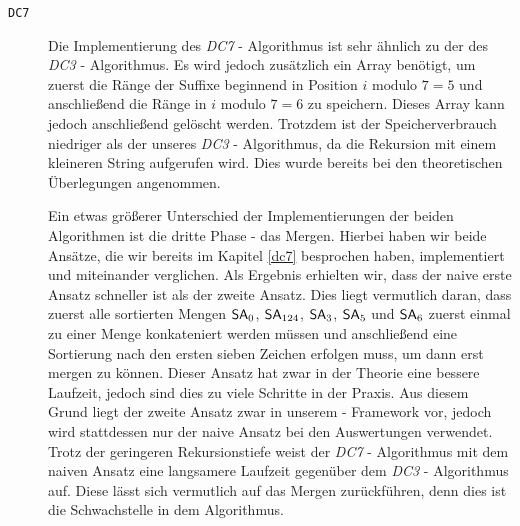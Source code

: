 \begin{description}
	\item[\texttt{DC7}]

	Die Implementierung des \emph{DC7} - Algorithmus ist sehr ähnlich zu der des \emph{DC3} - Algorithmus. Es wird jedoch zusätzlich ein Array benötigt, um zuerst die Ränge der Suffixe beginnend in Position $i \text{ modulo } 7 = 5$ und anschließend die Ränge in $i \text{ modulo } 7 = 6$ zu speichern. Dieses Array kann jedoch anschließend gelöscht werden.
	Trotzdem ist der Speicherverbrauch niedriger als der unseres \emph{DC3} - Algorithmus, da die Rekursion mit einem kleineren String aufgerufen wird. Dies wurde bereits bei den theoretischen Überlegungen angenommen.

	Ein etwas größerer Unterschied der Implementierungen der beiden Algorithmen ist die dritte Phase - das Mergen. Hierbei haben wir beide Ansätze, die wir bereits im Kapitel \ref{dc7} besprochen haben, implementiert und miteinander verglichen. Als Ergebnis erhielten wir, dass der naive erste Ansatz schneller ist als der zweite Ansatz. Dies liegt vermutlich daran, dass zuerst alle sortierten Mengen $\sa_0$, $\sa_{124}$, $\sa_3$, $\sa_5$ und  $\sa_6$ zuerst einmal zu einer Menge konkateniert werden müssen und anschließend eine Sortierung nach den ersten sieben Zeichen erfolgen muss, um dann erst mergen zu können. Dieser Ansatz hat zwar in der Theorie eine bessere Laufzeit, jedoch sind dies zu viele Schritte in der Praxis. Aus diesem Grund liegt der zweite Ansatz zwar in unserem \sacabench - Framework vor, jedoch wird stattdessen nur der naive Ansatz bei den Auswertungen verwendet.
	Trotz der geringeren Rekursionstiefe weist der \emph{DC7} - Algorithmus mit dem naiven Ansatz eine langsamere Laufzeit gegenüber dem \emph{DC3} - Algorithmus auf. Diese lässt sich vermutlich auf das Mergen zurückführen, denn dies ist die Schwachstelle in dem Algorithmus.

\end{description}
